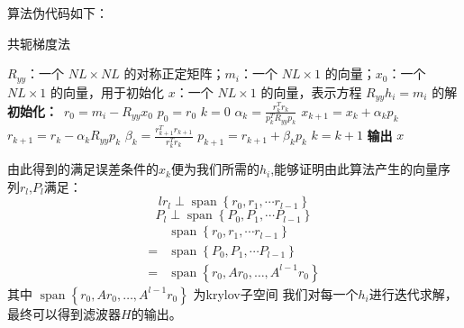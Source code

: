 算法伪代码如下：
\begin{algorithm}[H]
	\caption{共轭梯度法}
	\begin{algorithmic}[1] %
		\Require $R_{yy}$：一个 $NL \times NL$ 的对称正定矩阵；$m_i$：一个 $NL \times 1$ 的向量；$x_0$：一个 $NL \times 1$ 的向量，用于初始化
		\Ensure $x$：一个 $NL \times 1$ 的向量，表示方程 $R_{yy}h_i = m_i$ 的解\\
		\textbf{初始化：}\
		\State $r_0 =m_i - R_{yy}x_0$
		\State $p_0 = r_0$
		\State $k = 0$
		\State $\alpha_k = \frac{r_k^T r_k}{p_k^T R_{yy} p_k}$
		\State $x_{k+1} = x_k + \alpha_k p_k$
		\State $r_{k+1} = r_k - \alpha_k R_{yy} p_k$
		\State $\beta_k = \frac{r_{k+1}^T r_{k+1}}{r_k^T r_k}$
		\State $p_{k+1} = r_{k+1} + \beta_k p_k$
		\State $k = k + 1$
		\EndWhile
		\State \textbf{输出} $x$
	\end{algorithmic}
\end{algorithm}
由此得到的满足误差条件的$x_k$便为我们所需的$h_i$,能够证明由此算法产生的向量序列$r_l$,$P_l$满足：
\begin{equation}{l}
	r_{l} \perp \operatorname{span}\left\{r_{0}, r_{1}, \cdots r_{l-1}\right\} 
\end{equation}
\begin{equation}
	P_{l} \perp \operatorname{span}\left\{P_{0}, P_{1}, \cdots P_{l-1}\right\} 
\end{equation}
\begin{equation}
	\begin{aligned}
	&\operatorname{span}\left\{r_{0}, r_{1}, \cdots r_{l-1}\right\}\\
=&\operatorname{span}\left\{P_{0}, P_{1}, \cdots P_{l-1}\right\}\\
	=&\operatorname{span}\left\{r_{0}, A r_{0}, \ldots, A^{l-1} r_{0}\right\}
	\end{aligned}
\end{equation}
其中 $\operatorname{span}\left\{r_{0}, A r_{0}, \ldots, A^{l-1} r_{0}\right\}$ 为krylov子空间\cite{ref14}
我们对每一个$h_i$进行迭代求解，最终可以得到滤波器$H$的输出。
